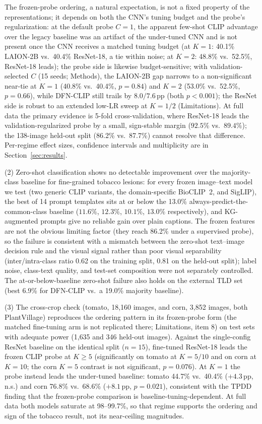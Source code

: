 \documentclass[10pt,a4paper]{article}
\begin{document}
The frozen-probe ordering, a natural expectation, is not a fixed property of the representations; it depends on both the CNN's tuning budget and the probe's regularization: at the default probe $C{=}1$, the apparent few-shot CLIP advantage over the legacy baseline was an artifact of the under-tuned CNN and is not present once the CNN receives a matched tuning budget (at $K{=}1$: 40.1\% LAION-2B vs.\ 40.4\% ResNet-18, a tie within noise; at $K{=}2$: 48.8\% vs.\ 52.5\%, ResNet-18 leads); the probe side is likewise budget-sensitive; with validation-selected $C$ (15 seeds; Methods), the LAION-2B gap narrows to a non-significant near-tie at $K{=}1$ (40.8\% vs.\ 40.4\%, $p{=}0.84$) and $K{=}2$ (53.0\% vs.\ 52.5\%, $p{=}0.66$), while DFN-CLIP still trails by $8.0/7.6$\,pp (both $p{<}0.001$); the ResNet side is robust to an extended low-LR sweep at $K{=}1/2$ (Limitations). At full data the primary evidence is 5-fold cross-validation, where ResNet-18 leads the validation-regularized probe by a small, sign-stable margin ($92.5\%$ vs.\ $89.4\%$); the 138-image held-out split (86.2\% vs.\ 87.7\%) cannot resolve that difference. Per-regime effect sizes, confidence intervals and multiplicity are in Section~\ref{sec:results}.

(2) Zero-shot classification shows no detectable improvement over the majority-class baseline for fine-grained tobacco lesions: for every frozen image--text model we test (two generic CLIP variants, the domain-specific BioCLIP~2, and SigLIP), the best of 14 prompt templates sits at or below the 13.0\% always-predict-the-common-class baseline ($11.6\%$, $12.3\%$, $10.1\%$, $13.0\%$ respectively), and KG-augmented prompts give no reliable gain over plain captions. The frozen features are not the obvious limiting factor (they reach 86.2\% under a supervised probe), so the failure is consistent with a mismatch between the zero-shot text--image decision rule and the visual signal rather than poor visual separability (inter/intra-class ratio 0.62 on the training split, 0.81 on the held-out split); label noise, class-text quality, and test-set composition were not separately controlled. The at-or-below-baseline zero-shot failure also holds on the external TLD set (best 6.9\% for DFN-CLIP vs.\ a 19.0\% majority baseline).

(3) The cross-crop check (tomato, 18{,}160 images, and corn, 3{,}852 images, both PlantVillage) reproduces the ordering pattern in its frozen-probe form (the matched fine-tuning arm is not replicated there; Limitations, item 8) on test sets with adequate power (1{,}635 and 346 held-out images). Against the single-config ResNet baseline on the identical split ($n{=}15$), fine-tuned ResNet-18 leads the frozen CLIP probe at $K{\geq}5$ (significantly on tomato at $K{=}5/10$ and on corn at $K{=}10$; the corn $K{=}5$ contrast is not significant, $p{=}0.076$). At $K{=}1$ the probe instead leads the under-tuned baseline: tomato 44.7\% vs.\ 40.4\% ($+4.3$\,pp, n.s.) and corn 76.8\% vs.\ 68.6\% ($+8.1$\,pp, $p{=}0.021$), consistent with the TPDD finding that the frozen-probe comparison is baseline-tuning-dependent. At full data both models saturate at 98--99.7\%, so that regime supports the ordering and sign of the tobacco result, not its near-ceiling magnitudes.
\end{document}
